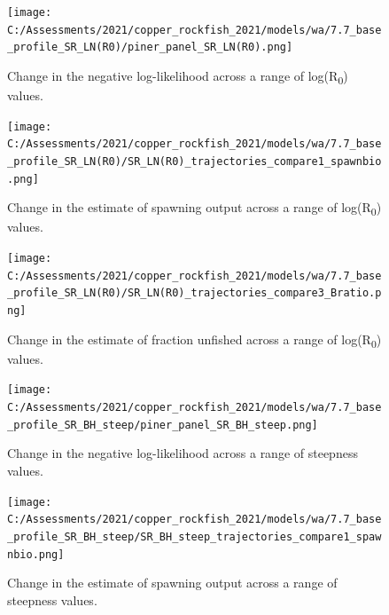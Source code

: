 \documentclass[11pt,
  english,
  a4paper,
]{article}
\begin{document}
\tagmcend\tagstructend


\begin{figure}
\centering
\texttt{[image: C:/Assessments/2021/copper\_rockfish\_2021/models/wa/7.7\_base\_profile\_SR\_LN(R0)/piner\_panel\_SR\_LN(R0).png]}
\caption{Change in the negative log-likelihood across a range of log(R\textsubscript{0}) values.\label{fig:r0-profile}}
\end{figure}

\tagmcend\tagstructend


\begin{figure}
\centering
\texttt{[image: C:/Assessments/2021/copper\_rockfish\_2021/models/wa/7.7\_base\_profile\_SR\_LN(R0)/SR\_LN(R0)\_trajectories\_compare1\_spawnbio.png]}
\caption{Change in the estimate of spawning output across a range of log(R\textsubscript{0}) values.\label{fig:r0-ssb}}
\end{figure}

\tagmcend\tagstructend


\begin{figure}
\centering
\texttt{[image: C:/Assessments/2021/copper\_rockfish\_2021/models/wa/7.7\_base\_profile\_SR\_LN(R0)/SR\_LN(R0)\_trajectories\_compare3\_Bratio.png]}
\caption{Change in the estimate of fraction unfished across a range of log(R\textsubscript{0}) values.\label{fig:r0-depl}}
\end{figure}

\tagmcend\tagstructend


\begin{figure}
\centering
\texttt{[image: C:/Assessments/2021/copper\_rockfish\_2021/models/wa/7.7\_base\_profile\_SR\_BH\_steep/piner\_panel\_SR\_BH\_steep.png]}
\caption{Change in the negative log-likelihood across a range of steepness values.\label{fig:h-profile}}
\end{figure}

\tagmcend\tagstructend


\begin{figure}
\centering
\texttt{[image: C:/Assessments/2021/copper\_rockfish\_2021/models/wa/7.7\_base\_profile\_SR\_BH\_steep/SR\_BH\_steep\_trajectories\_compare1\_spawnbio.png]}
\caption{Change in the estimate of spawning output across a range of steepness values.\label{fig:h-ssb}}
\end{figure}
\end{document}
